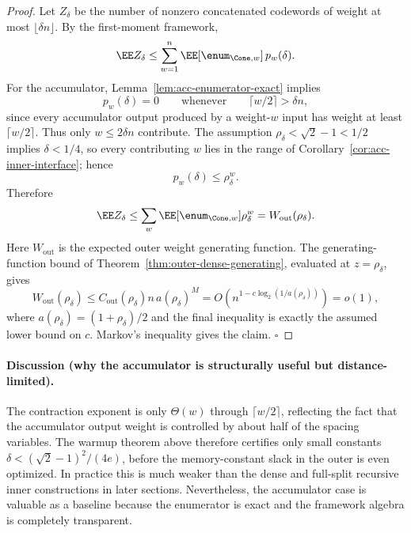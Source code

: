 \begin{proof}
Let \(Z_\delta\) be the number of nonzero concatenated codewords of weight at most \(\lfloor\delta n\rfloor\).
By the first-moment framework,
\[
\EE Z_\delta
\le
\sum_{w=1}^{n}\EE[\enum_{\Cone,w}]\,p_w(\delta).
\]
For the accumulator, Lemma~\ref{lem:acc-enumerator-exact} implies
\[
p_w(\delta)=0
\qquad\text{whenever}\qquad
\lceil w/2\rceil>\delta n,
\]
since every accumulator output produced by a weight-\(w\) input has weight at least \(\lceil w/2\rceil\).
Thus only \(w\le 2\delta n\) contribute.  The assumption \(\rho_\delta<\sqrt2-1<1/2\) implies
\(\delta<1/4\), so every contributing \(w\) lies in the range of Corollary~\ref{cor:acc-inner-interface}; hence
\[
p_w(\delta)\le \rho_\delta^w.
\]
Therefore
\[
\EE Z_\delta
\le
\sum_w \EE[\enum_{\Cone,w}]\rho_\delta^w
=
W_{\mathrm{out}}(\rho_\delta).
\]
Here \(W_{\mathrm{out}}\) is the expected outer weight generating function.  The generating-function bound of
Theorem~\ref{thm:outer-dense-generating}, evaluated at \(z=\rho_\delta\), gives
\[
W_{\mathrm{out}}(\rho_\delta)
\le
C_{\mathrm{out}}(\rho_\delta)n\,a(\rho_\delta)^M
=
O\!\left(n^{1-c\log_2(1/a(\rho_\delta))}\right)
=o(1),
\]
where \(a(\rho_\delta)=(1+\rho_\delta)/2\) and the final inequality is exactly the assumed lower bound on \(c\).
Markov's inequality gives the claim. \(\square\)
\end{proof}

\paragraph{Discussion (why the accumulator is structurally useful but distance-limited).}
The contraction exponent is only \(\Theta(w)\) through \(\lceil w/2\rceil\), reflecting the fact that the accumulator output weight
is controlled by about half of the spacing variables.  The warmup theorem above therefore certifies only small constants
\(\delta<(\sqrt2-1)^2/(4e)\), before the memory-constant slack in the outer is even optimized.  In practice this is much
weaker than the dense and full-split recursive inner constructions in later sections.
Nevertheless, the accumulator case is valuable as a baseline because the enumerator is exact and the framework algebra is completely transparent.
